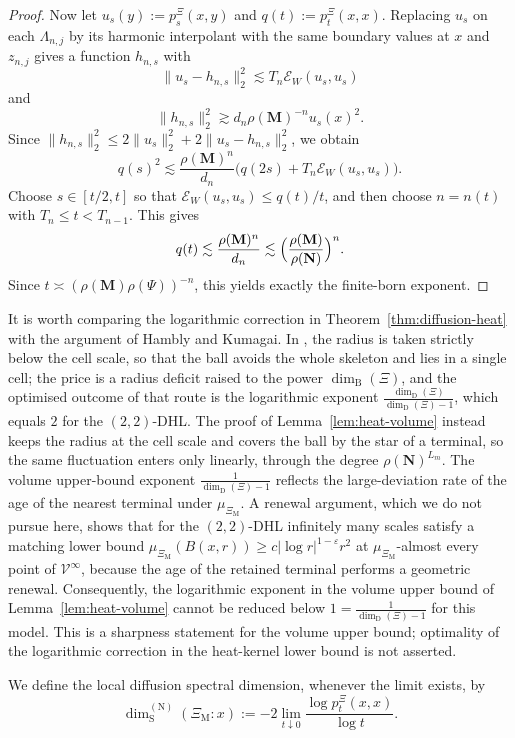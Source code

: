 \documentclass{article}
\theoremstyle{plain}
\theoremstyle{definition}
\newcommand{\dimbox}{\dim_\mathrm{B}}
\newcommand{\dimdeg}{\dim_\mathrm{D}}
\newcommand{\dimspec}{\dim_\mathrm{S}}
\begin{document}
\begin{proof}
Now let $u_s(y):=p_s^\Xi(x,y)$ and $q(t):=p_t^\Xi(x,x)$.
Replacing $u_s$ on each $\Lambda_{n,j}$ by its harmonic interpolant with the same boundary values at $x$ and $z_{n,j}$ gives a function $h_{n,s}$ with
\[
\|u_s-h_{n,s}\|_2^2
\lesssim
T_n\mathcal E_W(u_s,u_s)
\]
and
\[
\|h_{n,s}\|_2^2
\gtrsim
d_n\rho(\mathbf M)^{-n}u_s(x)^2.
\]
Since $\|h_{n,s}\|_2^2\le 2\|u_s\|_2^2+2\|u_s-h_{n,s}\|_2^2$, we obtain
\[
q(s)^2
\lesssim
\frac{\rho(\mathbf M)^n}{d_n}\bigl(q(2s)+T_n\mathcal E_W(u_s,u_s)\bigr).
\]
Choose $s\in[t/2,t]$ so that $\mathcal E_W(u_s,u_s)\le q(t)/t$, and then choose $n=n(t)$ with $T_n\le t<T_{n-1}$.
This gives
\[
q(t)\lesssim \frac{\rho(\mathbf M)^n}{d_n}\lesssim \Bigl(\frac{\rho(\mathbf M)}{\rho(\mathbf N)}\Bigr)^n.
\]
Since $t\asymp (\rho(\mathbf M)\rho(\Psi))^{-n}$, this yields exactly the finite-born exponent.
\end{proof}

It is worth comparing the logarithmic correction in Theorem~\ref{thm:diffusion-heat} with the argument of Hambly and Kumagai.
In \cite{hambly2010diffusion}, the radius is taken strictly below the cell scale, so that the ball avoids the whole skeleton and lies in a single cell; the price is a radius deficit raised to the power $\dimbox(\Xi)$, and the optimised outcome of that route is the logarithmic exponent $\frac{\dimdeg(\Xi)}{\dimdeg(\Xi)-1}$, which equals $2$ for the $(2,2)$-DHL.
The proof of Lemma~\ref{lem:heat-volume} instead keeps the radius at the cell scale and covers the ball by the star of a terminal, so the same fluctuation enters only linearly, through the degree $\rho(\mathbf N)^{L_m}$.
The volume upper-bound exponent $\frac{1}{\dimdeg(\Xi)-1}$ reflects the large-deviation rate of the age of the nearest terminal under $\mu_{\Xi_{\mathrm M}}$.
A renewal argument, which we do not pursue here, shows that for the $(2,2)$-DHL infinitely many scales satisfy a matching lower bound $\mu_{\Xi_{\mathrm M}}(B(x,r))\ge c|\log r|^{1-\varepsilon}r^{2}$ at $\mu_{\Xi_{\mathrm M}}$-almost every point of $\mathscr V^\infty$, because the age of the retained terminal performs a geometric renewal. Consequently, the logarithmic exponent in the volume upper bound of Lemma~\ref{lem:heat-volume} cannot be reduced below $1=\frac{1}{\dimdeg(\Xi)-1}$ for this model. This is a sharpness statement for the volume upper bound; optimality of the logarithmic correction in the heat-kernel lower bound is not asserted.

We define the local diffusion spectral dimension, whenever the limit exists, by
\[
\dimspec^{(\mathrm N)}(\Xi_{\mathrm M}:x)
:=
-2 \lim_{t \downarrow 0} \frac{\log p_t^\Xi(x,x)}{\log t}.
\]
\end{document}
